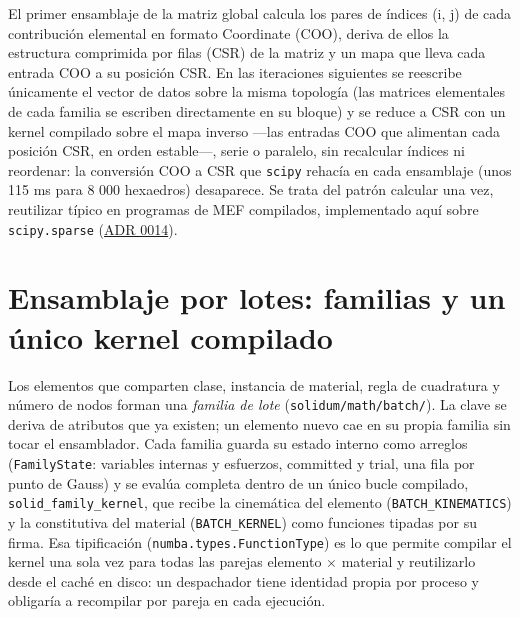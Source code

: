 \documentclass[11pt,oneside]{report}
\begin{document}
El primer ensamblaje de la matriz global calcula los pares de índices (i, j) de cada contribución elemental en formato Coordinate (COO), deriva de ellos la estructura comprimida por filas (CSR) de la matriz y un mapa que lleva cada entrada COO a su posición CSR. En las iteraciones siguientes se reescribe únicamente el vector de datos sobre la misma topología (las matrices elementales de cada familia se escriben directamente en su bloque) y se reduce a CSR con un kernel compilado sobre el mapa inverso ---las entradas COO que alimentan cada posición CSR, en orden estable---, serie o paralelo, sin recalcular índices ni reordenar: la conversión COO a CSR que \texttt{scipy} rehacía en cada ensamblaje (unos 115 ms para 8 000 hexaedros) desaparece. Se trata del patrón \textquotedbl{}calcular una vez, reutilizar\textquotedbl{} típico en programas de MEF compilados, implementado aquí sobre \texttt{scipy.sparse} (\hyperref[adr:0014]{ADR 0014}).

\section{Ensamblaje por lotes: familias y un único kernel compilado}

Los elementos que comparten clase, instancia de material, regla de cuadratura y número de nodos forman una \textit{familia de lote} (\texttt{solidum/\allowbreak{}math/\allowbreak{}batch/\allowbreak{}}). La clave se deriva de atributos que ya existen; un elemento nuevo cae en su propia familia sin tocar el ensamblador. Cada familia guarda su estado interno como arreglos (\texttt{FamilyState}: variables internas y esfuerzos, committed y trial, una fila por punto de Gauss) y se evalúa completa dentro de un único bucle compilado, \texttt{solid\_\allowbreak{}family\_\allowbreak{}kernel}, que recibe la cinemática del elemento (\texttt{BATCH\_KINEMATICS}) y la constitutiva del material (\texttt{BATCH\_KERNEL}) como funciones tipadas por su firma. Esa tipificación (\texttt{numba.\allowbreak{}types.\allowbreak{}FunctionType}) es lo que permite compilar el kernel una sola vez para todas las parejas elemento \ensuremath{\times} material y reutilizarlo desde el caché en disco: un despachador tiene identidad propia por proceso y obligaría a recompilar por pareja en cada ejecución.
\end{document}
